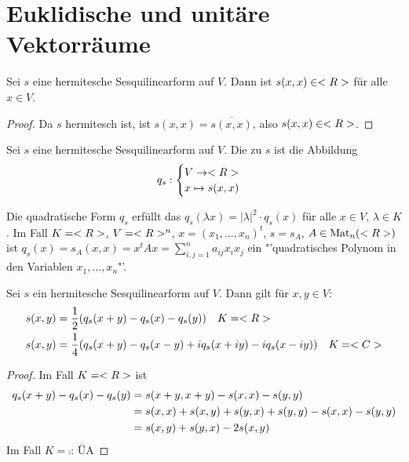 \section{Euklidische und unitäre Vektorräume}

\begin{lemma}
	Sei $s$ eine hermitesche Sesquilinearform auf $V$. Dann ist $s(x,x)\in<R>$ für alle $x\in V$.
\end{lemma}
\begin{proof}
	Da $s$ hermitesch ist, ist $s(x,x)=\overline{s(x,x)}$, also $s(x,x)\in<R>$.
\end{proof}

\begin{definition}
	Sei $s$ eine hermitesche Sesquilinearform auf $V$. Die  zu $s$ ist die Abbildung
	\begin{align}
		q_s:\begin{cases}
		V\to <R> \\ x\mapsto s(x,x)
		\end{cases}\notag
	\end{align}
\end{definition}

\begin{remark}
	Die quadratische Form $q_s$ erfüllt das $q_s(\lambda x)=\vert\lambda\vert^2\cdot q_s(x)$ für alle $x\in V$, $\lambda\in K$. Im Fall $K=<R>$, $V=<R>^n$, $x=(x_1,...,x_n)^t$, $s=s_A$, $A\in\operatorname{Mat}_n(<R>)$ ist $q_s(x)=s_A(x,x)=x^tAx=\sum_{i,j=1}^n a_{ij}x_ix_j$ ein "'quadratisches Polynom in den Variablen $x_1,...,x_n$"'.
\end{remark}

\begin{proposition}[Polarisierung]
	Sei $s$ ein hermitesche Sesquilinearform auf $V$. Dann gilt für $x,y\in V$:
	\begin{align}
		s(x,y)&=\frac 1 2 (q_s(x+y)-q_s(x)-q_s(y))\quad K=<R>\notag \\
		s(x,y)&=\frac 1 4 (q_s(x+y)-q_s(x-y)+iq_s(x+iy)-iq_s(x-iy))\quad K=<C>\notag
	\end{align}
\end{proposition}
\begin{proof}
	Im Fall $K=<R>$ ist
	\begin{align}
		q_s(x+y)-q_s(x)-q_s(y)&= s(x+y,x+y)-s(x,x)-s(y,y)\notag \\
		&= s(x,x)+s(x,y)+s(y,x)+s(y,y)-s(x,x)-s(y,y)\notag \\
		&= s(x,y)+s(y,x)-2s(x,y)\notag
	\end{align}
	Im Fall $K=\comp$: ÜA
\end{proof}